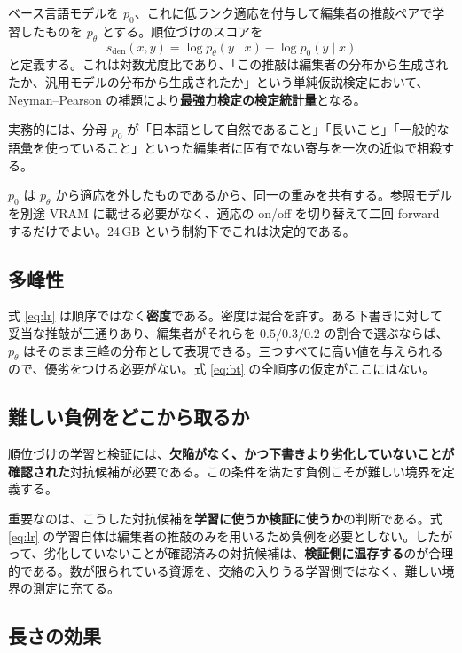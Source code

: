 \documentclass[a4paper,10.5pt]{ltjsarticle}
\begin{document}
ベース言語モデルを $p_0$、これに低ランク適応を付与して編集者の推敲ペアで学習したものを $p_\theta$ とする。順位づけのスコアを
\begin{equation}
  s_{\mathrm{den}}(x,y) = \log p_\theta(y \mid x) - \log p_0(y \mid x)
  \label{eq:lr}
\end{equation}
と定義する。これは対数尤度比であり、「この推敲は編集者の分布から生成されたか、汎用モデルの分布から生成されたか」という単純仮説検定において、Neyman--Pearson の補題により\textbf{最強力検定の検定統計量}となる。

実務的には、分母 $p_0$ が「日本語として自然であること」「長いこと」「一般的な語彙を使っていること」といった編集者に固有でない寄与を一次の近似で相殺する。

$p_0$ は $p_\theta$ から適応を外したものであるから、同一の重みを共有する。参照モデルを別途 VRAM に載せる必要がなく、適応の on/off を切り替えて二回 forward するだけでよい。24\,GB という制約下でこれは決定的である。

\subsection{多峰性}

式 \eqref{eq:lr} は順序ではなく\textbf{密度}である。密度は混合を許す。ある下書きに対して妥当な推敲が三通りあり、編集者がそれらを $0.5/0.3/0.2$ の割合で選ぶならば、$p_\theta$ はそのまま三峰の分布として表現できる。三つすべてに高い値を与えられるので、優劣をつける必要がない。式 \eqref{eq:bt} の全順序の仮定がここにはない。

\subsection{難しい負例をどこから取るか}

順位づけの学習と検証には、\textbf{欠陥がなく、かつ下書きより劣化していないことが確認された}対抗候補が必要である。この条件を満たす負例こそが難しい境界を定義する。

重要なのは、こうした対抗候補を\textbf{学習に使うか検証に使うか}の判断である。式 \eqref{eq:lr} の学習自体は編集者の推敲のみを用いるため負例を必要としない。したがって、劣化していないことが確認済みの対抗候補は、\textbf{検証側に温存する}のが合理的である。数が限られている資源を、交絡の入りうる学習側ではなく、難しい境界の測定に充てる。

\subsection{長さの効果}
\end{document}
